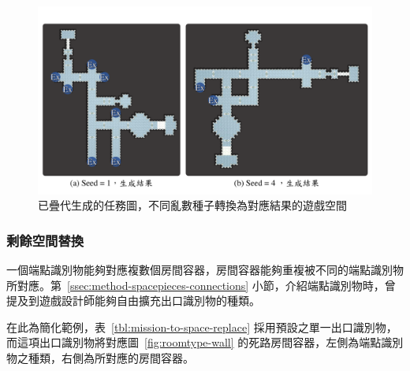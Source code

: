 \begin{figure}[!htb]
  \begin{center}
    \includegraphics[width=1.0\textwidth]{figures/mission-to-space-instruction-result.pdf}
    \caption{已疊代生成的任務圖，不同亂數種子轉換為對應結果的遊戲空間} 
    \label{fig:mission-to-space-instruction-result}
  \end{center}
\end{figure}

\subsubsection{剩餘空間替換}
\label{sssec:method-spacepieces-frommissiontospace-replacement}

一個端點識別物能夠對應複數個房間容器，房間容器能夠重複被不同的端點識別物所對應。第~\ref{ssec:method-spacepieces-connections} 小節，介紹端點識別物時，曾提及到遊戲設計師能夠自由擴充出口識別物的種類。

在此為簡化範例，表~\ref{tbl:mission-to-space-replace} 採用預設之單一出口識別物，而這項出口識別物將對應圖~\ref{fig:roomtype-wall} 的死路房間容器，左側為端點識別物之種類，右側為所對應的房間容器。

